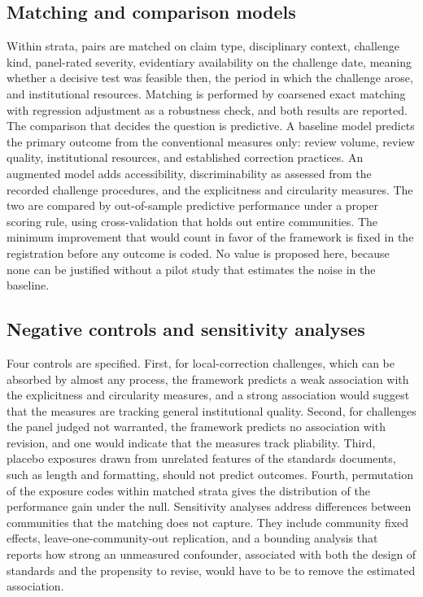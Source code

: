 \documentclass[11pt]{article}
\theoremstyle{remark}
\begin{document}
\subsection{Matching and comparison models}

Within strata, pairs are matched on claim type, disciplinary context, challenge kind, panel-rated severity, evidentiary availability on the challenge date, meaning whether a decisive test was feasible then, the period in which the challenge arose, and institutional resources. Matching is performed by coarsened exact matching with regression adjustment as a robustness check, and both results are reported. The comparison that decides the question is predictive. A baseline model predicts the primary outcome from the conventional measures only: review volume, review quality, institutional resources, and established correction practices. An augmented model adds accessibility, discriminability as assessed from the recorded challenge procedures, and the explicitness and circularity measures. The two are compared by out-of-sample predictive performance under a proper scoring rule, using cross-validation that holds out entire communities. The minimum improvement that would count in favor of the framework is fixed in the registration before any outcome is coded. No value is proposed here, because none can be justified without a pilot study that estimates the noise in the baseline.

\subsection{Negative controls and sensitivity analyses}

Four controls are specified. First, for local-correction challenges, which can be absorbed by almost any process, the framework predicts a weak association with the explicitness and circularity measures, and a strong association would suggest that the measures are tracking general institutional quality. Second, for challenges the panel judged not warranted, the framework predicts no association with revision, and one would indicate that the measures track pliability. Third, placebo exposures drawn from unrelated features of the standards documents, such as length and formatting, should not predict outcomes. Fourth, permutation of the exposure codes within matched strata gives the distribution of the performance gain under the null. Sensitivity analyses address differences between communities that the matching does not capture. They include community fixed effects, leave-one-community-out replication, and a bounding analysis that reports how strong an unmeasured confounder, associated with both the design of standards and the propensity to revise, would have to be to remove the estimated association.
\end{document}
